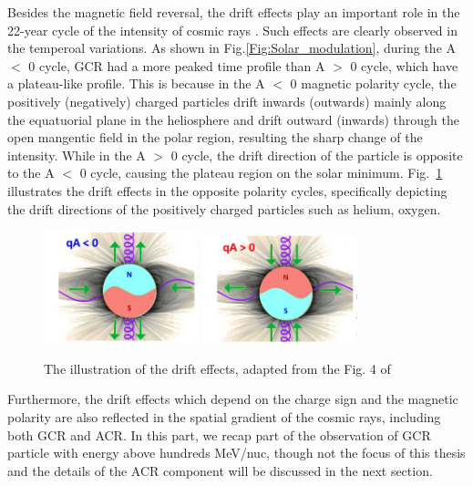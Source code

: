 Besides the magnetic field reversal, the drift effects play an important role in the 22-year cycle of the intensity of cosmic rays \citep{Jokipii1977ApJ}. Such effects are clearly observed in the temperoal variations.
As shown in Fig.\ref{Fig:Solar_modulation}, during the A $<$ 0 cycle, \ac{GCR} had a more peaked time profile than A $>$ 0 cycle, which have a plateau-like profile. 
This is because in the A $<$ 0 magnetic polarity cycle, the positively (negatively) charged particles drift inwards (outwards) mainly along the equatuorial plane in the heliosphere and drift outward (inwards) through the open mangentic field in the polar region, resulting the sharp change of the intensity. While in the A $>$ 0 cycle, the drift direction of the particle is opposite to the A $<$ 0 cycle, causing the plateau region on the solar minimum. Fig.~\ref{Fig:drift_effect} illustrates the drift effects in the opposite polarity cycles, specifically depicting the drift directions of the positively charged particles such as helium, oxygen.

\begin{figure}
	\centering
	\includegraphics[width = 0.4\textwidth]{images/drift_effect.png}
	\includegraphics[width = 0.4\textwidth]{images/drift_effect_2.png}
	\caption{The illustration of the drift effects, adapted from the Fig. 4 of \citep{Rankin2022ApJ}}
	\label{Fig:drift_effect}	
\end{figure}

Furthermore, the drift effects which depend on the charge sign and the magnetic polarity are also reflected in the spatial gradient of the cosmic rays, including both \ac{GCR} and \ac{ACR}. In this part, we recap part of the observation of \ac{GCR} particle with energy above hundreds MeV/nuc, though not the focus of this thesis and the details of the \ac{ACR} component will be discussed in the next section.

